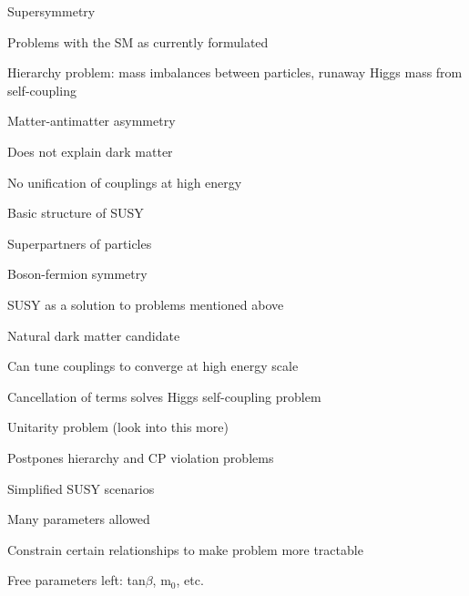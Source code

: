 \documentclass[11pt]{report}
\begin{document}
\begin{outline}
	\item Supersymmetry
	\begin{outline}
		\item Problems with the SM as currently formulated
		\begin{outline}
			\item Hierarchy problem: mass imbalances between particles, runaway Higgs mass from self-coupling
			\item Matter-antimatter asymmetry
			\item Does not explain dark matter
			\item No unification of couplings at high energy
		\end{outline}
		\item Basic structure of SUSY
		\begin{outline}
			\item Superpartners of particles
			\item Boson-fermion symmetry
		\end{outline}
		\item SUSY as a solution to problems mentioned above
		\begin{outline}
			\item Natural dark matter candidate
			\item Can tune couplings to converge at high energy scale
			\item Cancellation of terms solves Higgs self-coupling problem
			\item Unitarity problem (look into this more)
			\item Postpones hierarchy and CP violation problems
		\end{outline}
		\item Simplified SUSY scenarios
		\begin{outline}
			\item Many parameters allowed
			\item Constrain certain relationships to make problem more tractable
			\item Free parameters left: tan$\beta$, m$_0$, etc.
		\end{outline}
	\end{outline}
	

\end{outline}
\end{document}

